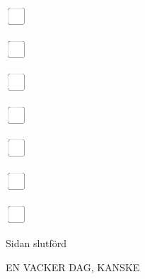 \documentclass[11pt,titlepage]{article}
\begin{document}
\vspace{10mm}

\noindent
\includegraphics[]{checkbox-4mm.pdf}

\vspace{10mm}

\noindent
\includegraphics[]{checkbox-4mm.pdf}

\vspace{10mm}

\noindent
\includegraphics[]{checkbox-4mm.pdf}

\vspace{10mm}

\noindent
\includegraphics[]{checkbox-4mm.pdf}

\vspace{10mm}

\noindent
\includegraphics[]{checkbox-4mm.pdf}

\vspace{10mm}

\noindent
\includegraphics[]{checkbox-4mm.pdf}

\vspace{10mm}

\noindent
\includegraphics[]{checkbox-4mm.pdf}

\vspace{4mm}

\hfill Sidan slutförd \hspace{20mm}

\pagebreak

\small %
\hfill EN VACKER DAG, KANSKE
\end{document}
